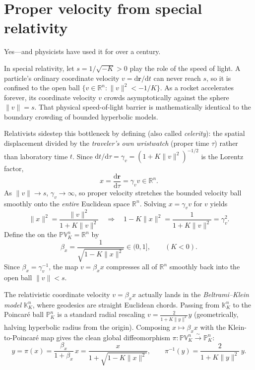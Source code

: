 \section{Proper velocity from special relativity}

Yes---and physicists have used it for over a century.

In special relativity, let \(s = 1/\sqrt{-K} > 0\) play the role of the speed of light. A particle's ordinary coordinate velocity \(v = \mathrm{d}\mathbf{r}/\mathrm{d}t\) can never reach \(s\), so it is confined to the open ball \(\{v\in\mathbb{R}^n : \|v\|^2 < -1/K\}\). As a rocket accelerates forever, its coordinate velocity \(v\) crowds asymptotically against the sphere \(\|v\|=s\). That physical speed-of-light barrier is mathematically identical to the boundary crowding of bounded hyperbolic models.

Relativists sidestep this bottleneck by defining  (also called \emph{celerity}): the spatial displacement divided by the \emph{traveler's own wristwatch} (proper time \(\tau\)) rather than laboratory time \(t\). Since \(\mathrm{d}t/\mathrm{d}\tau = \gamma_v = (1+K\|v\|^2)^{-1/2}\) is the Lorentz factor,
\[
  x = \frac{\mathrm{d}\mathbf{r}}{\mathrm{d}\tau} = \gamma_v v \in \mathbb{R}^n.
\]
As \(\|v\|\to s\), \(\gamma_v\to\infty\), so proper velocity stretches the bounded velocity ball smoothly onto the \emph{entire} Euclidean space \(\mathbb{R}^n\). Solving \(x=\gamma_v v\) for \(v\) yields
\[
  \|x\|^2 = \frac{\|v\|^2}{1+K\|v\|^2}
  \quad\Longrightarrow\quad
  1 - K\|x\|^2 = \frac{1}{1+K\|v\|^2} = \gamma_v^2.
\]
Define the  on the  \(\mathbb{PV}_K^n = \mathbb{R}^n\) by
\begin{equation}
  \beta_x = \frac{1}{\sqrt{1-K\|x\|^2}} \in (0,1],
  \qquad (K<0).
  \label{eq:N20261121-beta}
\end{equation}
Since \(\beta_x = \gamma_v^{-1}\), the map \(v = \beta_x x\) compresses all of \(\mathbb{R}^n\) smoothly back into the open ball \(\|v\|<s\).

\begin{remark}
The relativistic coordinate velocity \(v=\beta_x x\) actually lands in the \emph{Beltrami--Klein model} \(\mathbb{K}_K^n\), where geodesics are straight Euclidean chords. Passing from \(\mathbb{K}_K^n\) to the Poincar\'e ball \(\mathbb{P}_K^n\) is a standard radial rescaling \(v = \frac{2}{1+K\|y\|^2}y\) (geometrically, halving hyperbolic radius from the origin). Composing \(x\mapsto \beta_x x\) with the Klein-to-Poincar\'e map gives the clean global diffeomorphism \(\pi:\mathbb{PV}_K^n \xrightarrow{\sim} \mathbb{P}_K^n\):
\begin{equation}
  y = \pi(x) = \frac{\beta_x}{1+\beta_x}\,x = \frac{x}{1+\sqrt{1-K\|x\|^2}},
  \qquad
  \pi^{-1}(y) = \frac{2}{1+K\|y\|^2}\,y.
  \label{eq:N20261121-pi}
\end{equation}
\end{remark}


